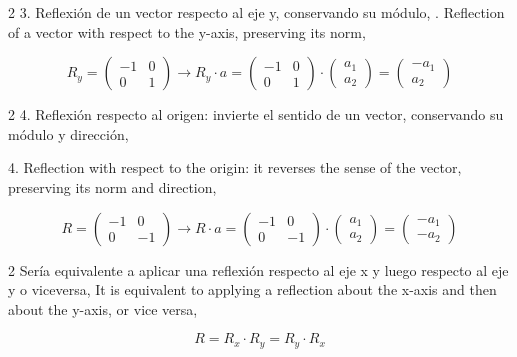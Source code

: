 \begin{paracol}{2}
3. Reflexión de un vector respecto al eje y, conservando su módulo,
. Reflection of a vector with respect to the y-axis, preserving its norm, 
\end{paracol}
\begin{equation*}
R_y=\begin{pmatrix}
-1& 0\\
0& 1
\end{pmatrix} \rightarrow R_y\cdot a = \begin{pmatrix}
-1& 0\\
0& 1
\end{pmatrix} \cdot \begin{pmatrix}
a_1\\
a_2
\end{pmatrix}= \begin{pmatrix}
-a_1\\
a_2
\end{pmatrix}
\end{equation*}
\begin{paracol}{2}
4. Reflexión respecto al origen: invierte el sentido de un vector, conservando su módulo y dirección,
\switchcolumn

4. Reflection with respect to the origin: it reverses the sense of the vector, preserving its norm and direction, 
\end{paracol}
\begin{equation*}
R=\begin{pmatrix}
-1& 0\\
0& -1
\end{pmatrix} \rightarrow R\cdot a = \begin{pmatrix}
-1& 0\\
0& -1
\end{pmatrix} \cdot \begin{pmatrix}
a_1\\
a_2
\end{pmatrix}= \begin{pmatrix}
-a_1\\
-a_2
\end{pmatrix}
\end{equation*}
\begin{paracol}{2}
Sería equivalente a aplicar una reflexión respecto al eje x y luego respecto al eje y o viceversa,
\switchcolumn
It is equivalent to applying a reflection about the x-axis and then about the y-axis, or vice versa,
\end{paracol}
\begin{equation*}
R=R_x\cdot R_y= R_y\cdot R_x
\end{equation*}
